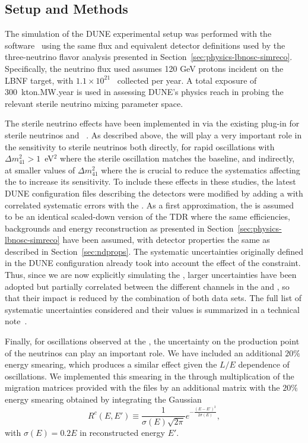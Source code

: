 \subsection{Setup and Methods}
The simulation of the DUNE experimental setup was performed with the  software~\cite{Huber:2004ka,Huber:2007ji} using the same flux and equivalent detector definitions used by the three-neutrino flavor analysis presented in Section~\ref{sec:physics-lbnosc-simreco}. Specifically, the neutrino flux used assumes 120 GeV protons incident on the LBNF target, with $1.1\times 10^{21}$~ collected per year. A total exposure of 300~kton.MW.year is used in assessing DUNE's physics reach in probing the relevant sterile neutrino mixing parameter space.

The sterile neutrino effects have been implemented in   via the existing plug-in for sterile neutrinos and ~\cite{Joachim}. As described above, the  will play a very important role in the sensitivity to sterile neutrinos both directly, for rapid oscillations with $\Delta m_{41}^2 > 1$~eV$^2$ where the sterile oscillation matches the  baseline, and indirectly, at smaller values of $\Delta m_{41}^2$ where the  is crucial to reduce the systematics affecting the  to increase its sensitivity. To include these  effects in these studies, the latest  DUNE  configuration files describing the detectors were modified by adding a  with correlated systematic errors with the . As a first approximation, the  is assumed to be an identical scaled-down version of the TDR  where the same efficiencies, backgrounds and energy reconstruction as presented in Section~\ref{sec:physics-lbnosc-simreco} have been assumed, with detector properties the same as described in Section~\ref{sec:ndprops}. The systematic uncertainties originally defined in the  DUNE  configuration already took into account the effect of the  constraint. Thus, since we are now explicitly simulating the , larger uncertainties have been adopted but partially correlated between the different channels in the  and , so that their impact is reduced by the combination of both data sets. The full list of systematic uncertainties considered and their values is summarized in a technical note~\cite{ref:dune-sterile-note}.

Finally, for oscillations observed at the , the uncertainty on the production point of the neutrinos can play an important role. We have included an additional $20\%$ energy smearing, which produces a similar effect given the $L/E$ dependence of oscillations. We implemented this smearing in the  through multiplication of the migration matrices provided with the  files by an additional matrix with the $20\%$ energy smearing obtained by integrating the Gaussian
\begin{equation}
R^c(E,E')\equiv\frac{1}{\sigma(E)\sqrt{2\pi}}e^{-\frac{(E-E')^2}{2\sigma(E)}},
\label{R_mat}
\end{equation}
with $\sigma(E)=0.2 E$ in reconstructed energy $E'$.

